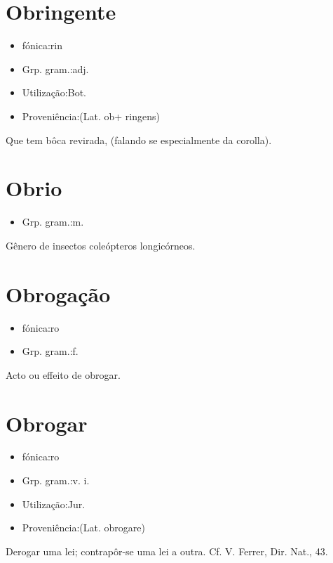 \section{Obringente}
\begin{itemize}
\item {fónica:rin}
\end{itemize}
\begin{itemize}
\item {Grp. gram.:adj.}
\end{itemize}
\begin{itemize}
\item {Utilização:Bot.}
\end{itemize}
\begin{itemize}
\item {Proveniência:(Lat. \textunderscore ob\textunderscore  + \textunderscore ringens\textunderscore )}
\end{itemize}
Que tem bôca revirada, (falando se especialmente da corolla).
\section{Obrio}
\begin{itemize}
\item {Grp. gram.:m.}
\end{itemize}
Gênero de insectos coleópteros longicórneos.
\section{Obrogação}
\begin{itemize}
\item {fónica:ro}
\end{itemize}
\begin{itemize}
\item {Grp. gram.:f.}
\end{itemize}
Acto ou effeito de obrogar.
\section{Obrogar}
\begin{itemize}
\item {fónica:ro}
\end{itemize}
\begin{itemize}
\item {Grp. gram.:v. i.}
\end{itemize}
\begin{itemize}
\item {Utilização:Jur.}
\end{itemize}
\begin{itemize}
\item {Proveniência:(Lat. \textunderscore obrogare\textunderscore )}
\end{itemize}
Derogar uma lei; contrapôr-se uma lei a outra. Cf. V. Ferrer, \textunderscore Dir. Nat.\textunderscore , 43.
